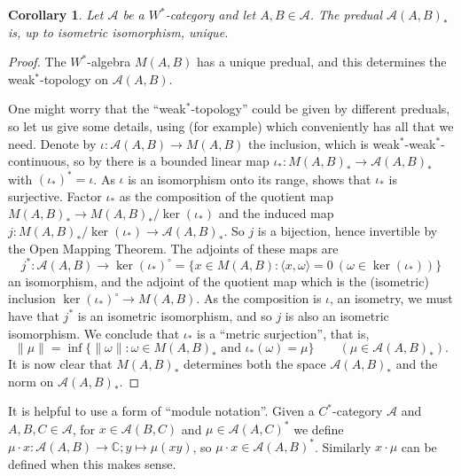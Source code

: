 \documentclass[a4paper,11pt]{article}
\theoremstyle{plain}
\newtheorem{corollary}[proposition]{Corollary}
\theoremstyle{remark}
\newcommand{\mc}[1]{\mathcal{#1}}
\newcommand{\ip}[2]{{\langle {#1} , {#2} \rangle}}
\begin{document}
\begin{corollary}
Let $\mc A$ be a $W^*$-category and let $A,B\in\mc A$.  The predual $\mc A(A,B)_*$ is, up to isometric isomorphism, unique.
\end{corollary}
\begin{proof}
The $W^*$-algebra $M(A,B)$ has a unique predual, and this determines the weak$^*$-topology on $\mc A(A,B)$.

One might worry that the ``weak$^*$-topology'' could be given by different preduals, so let us give some details, using (for example) \cite{MegginsonBook} which conveniently has all that we need.  Denote by $\iota \colon \mc A(A,B) \to M(A,B)$ the inclusion, which is weak$^*$-weak$^*$-continuous, so by \cite[Theorem~3.1.11]{MegginsonBook} there is a bounded linear map $\iota_* \colon M(A,B)_* \to \mc A(A,B)_*$ with $(\iota_*)^* = \iota$.  %
As $\iota$ is an isomorphism onto its range, \cite[Theorem~3.1.22]{MegginsonBook} shows that $\iota_*$ is surjective.  Factor $\iota_*$ as the composition of the quotient map $M(A,B)_* \to M(A,B)_* / \ker(\iota_*)$ and the induced map $j \colon M(A,B)_* / \ker(\iota_*) \to \mc A(A,B)_*$.  So $j$ is a bijection, hence invertible by the Open Mapping Theorem.  The adjoints of these maps are
\[ j^* \colon \mc A(A,B) \to \ker(\iota_*)^\circ = \{ x\in M(A,B) : \ip{x}{\omega}=0 \ (\omega\in\ker(\iota_*)) \} \]
an isomorphism, and the adjoint of the quotient map which is the (isometric) inclusion $\ker(\iota_*)^\circ \to M(A,B)$.  As the composition is $\iota$, an isometry, we must have that $j^*$ is an isometric isomorphism, and so $j$ is also an isometric isomorphism.  We conclude that $\iota_*$ is a ``metric surjection'', that is,
\[ \|\mu\| = \inf\bigl\{ \|\omega\| : \omega\in M(A,B)_* \text{ and } \iota_*(\omega)=\mu \bigr\} \qquad (\mu\in\mc A(A,B)_*). \]
It is now clear that $M(A,B)_*$ determines both the space $\mc A(A,B)_*$ and the norm on $\mc A(A,B)_*$.
\end{proof}

It is helpful to use a form of ``module notation''.  Given a $C^*$-category $\mc A$ and $A,B,C\in\mc A$, for $x\in\mc A(B,C)$ and $\mu\in\mc A(A,C)^*$ we define $\mu\cdot x \colon \mc A(A,B) \to \mathbb C; y \mapsto \mu(xy)$, so $\mu\cdot x\in\mc A(A,B)^*$.  Similarly $x\cdot\mu$ can be defined when this makes sense.
\end{document}
